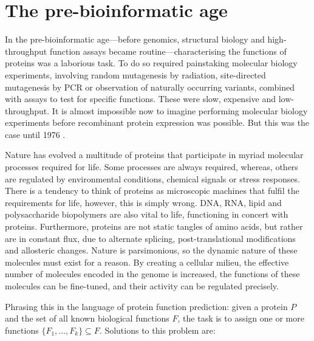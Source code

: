 \section{The pre-bioinformatic age}
\label{sec:intro-pre-bioinformatics-age}

In the pre-bioinformatic age---before genomics, structural biology and high-throughput function assays became routine---characterising the functions of proteins was a laborious task. To do so required painstaking molecular biology experiments, involving random mutagenesis by radiation, site-directed mutagenesis by PCR or observation of naturally occurring variants, combined with assays to test for specific functions. These were slow, expensive and low-throughput. It is almost impossible now to imagine performing molecular biology experiments before recombinant protein expression was possible. But this was the case until 1976 \cite{Itakura1977}.

Nature has evolved a multitude of proteins that participate in myriad molecular processes required for life. Some processes are always required, whereas, others are regulated by environmental conditions, chemical signals or stress responses. There is a tendency to think of proteins as microscopic machines that fulfil the requirements for life, however, this is simply wrong. DNA, RNA, lipid and polysaccharide biopolymers are also vital to life, functioning in concert with proteins. Furthermore, proteins are not static tangles of amino acids, but rather are in constant flux, due to alternate splicing, post-translational modifications and allosteric changes. Nature is parsimonious, so the dynamic nature of these molecules must exist for a reason. By creating a cellular milieu, the effective number of molecules encoded in the genome is increased, the functions of these molecules can be fine-tuned, and their activity can be regulated precisely.

Phrasing this in the language of protein function prediction: given a protein $P$ and the set of all known biological functions $F$, the task is to assign one or more functions $\{F_1 ,..., F_k\} \subseteq F$. Solutions to this problem are:

